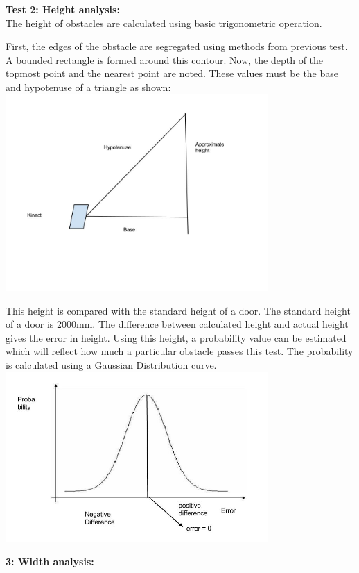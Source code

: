 \documentclass{report}
\begin{document}
\textbf{Test 2: Height analysis:} \\

The height of obstacles are calculated using basic trigonometric operation.

First, the edges of the obstacle are segregated using methods from previous test. 
A bounded rectangle is formed around this contour. Now, the depth of the topmost point and the nearest 
point are noted. These values must be the base and hypotenuse of a triangle as shown: \\

\includegraphics[width = 10cm]{pythagoras.jpg}

This height is compared with the standard height of a door. The standard height of a door is 2000mm. 
The difference between calculated height and actual height gives the error in height. Using this height, 
a probability value can be estimated which will reflect how much a particular obstacle passes this test. 
The probability is calculated using a Gaussian Distribution curve. \\

\includegraphics[width = 10cm]{Gaussian.jpg}

\textbf{3: Width analysis:} \\
\end{document}
